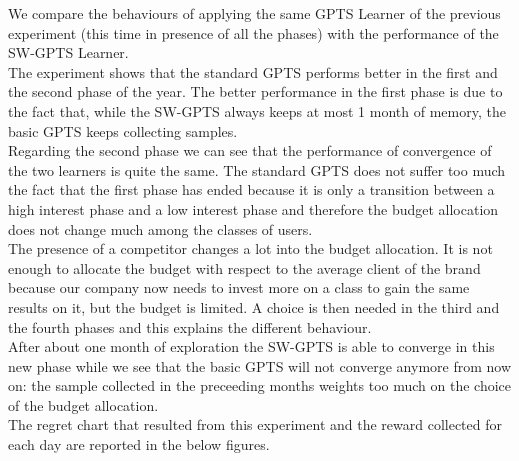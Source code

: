 We compare the behaviours of applying the same GPTS Learner of the previous experiment (this time in presence of all the phases) with the performance of the SW-GPTS Learner.
\\The experiment shows that the standard GPTS performs better in the first and the second phase of the year.  The better performance in the first phase is due to the fact that, while the SW-GPTS always keeps at most 1 month of memory, the basic GPTS keeps collecting samples. 
\\Regarding the second phase we can see that the performance of convergence of the two learners is quite the same. The standard GPTS does not suffer too much the fact that the first phase has ended because it is only a transition between a high interest phase and a low interest phase and therefore the budget allocation does not change much among the classes of users.
\\The presence of a competitor changes a lot into the budget allocation. It is not enough to allocate the budget with respect to the average client of the brand because our company now needs to invest more on a class to gain the same results on it, but the budget is limited. A choice is then needed in the third and the fourth phases and this explains the different behaviour. 
\\After about one month of exploration the SW-GPTS is able to converge in this new phase while we see that the basic GPTS will not converge anymore from now on: the sample collected in the preceeding months weights too much on the choice of the budget allocation.
\\The regret chart that resulted from this experiment and the reward collected for each day are reported in the below figures.\\
